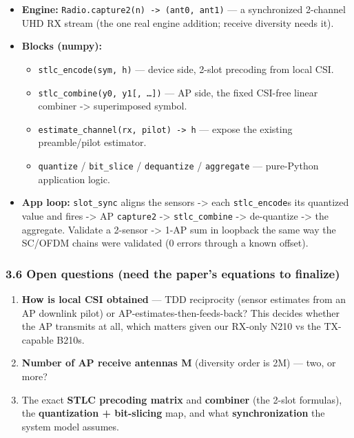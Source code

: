 \documentclass[
  10pt,
]{article}
\providecommand{\tightlist}{%
  \setlength{\itemsep}{0pt}\setlength{\parskip}{0pt}}
\begin{document}
\begin{itemize}
\tightlist
\item
  \textbf{Engine:}
  \texttt{Radio.capture2(n)\ -\textgreater{}\ (ant0,\ ant1)} --- a
  synchronized 2-channel UHD RX stream (the one real engine addition;
  receive diversity needs it).
\item
  \textbf{Blocks (numpy):}

  \begin{itemize}
  \tightlist
  \item
    \texttt{stlc\_encode(sym,\ h)} --- device side, 2-slot precoding
    from local CSI.
  \item
    \texttt{stlc\_combine(y0,\ y1{[},\ \ldots{}{]})} --- AP side, the
    fixed CSI-free linear combiner -\textgreater{} superimposed symbol.
  \item
    \texttt{estimate\_channel(rx,\ pilot)\ -\textgreater{}\ h} ---
    expose the existing preamble/pilot estimator.
  \item
    \texttt{quantize} / \texttt{bit\_slice} / \texttt{dequantize} /
    \texttt{aggregate} --- pure-Python application logic.
  \end{itemize}
\item
  \textbf{App loop:} \texttt{slot\_sync} aligns the sensors
  -\textgreater{} each \texttt{stlc\_encode}s its quantized value and
  fires -\textgreater{} AP \texttt{capture2} -\textgreater{}
  \texttt{stlc\_combine} -\textgreater{} de-quantize -\textgreater{} the
  aggregate. Validate a 2-sensor -\textgreater{} 1-AP sum in loopback
  the same way the SC/OFDM chains were validated (0 errors through a
  known offset).
\end{itemize}

\hypertarget{36-open-questions-need-the-papers-equations-to-finalize}{%
\subsubsection{3.6 Open questions (need the paper's equations to
finalize)}\label{36-open-questions-need-the-papers-equations-to-finalize}}

\begin{enumerate}
\def\labelenumi{\arabic{enumi}.}
\tightlist
\item
  \textbf{How is local CSI obtained} --- TDD reciprocity (sensor
  estimates from an AP downlink pilot) or AP-estimates-then-feeds-back?
  This decides whether the AP transmits at all, which matters given our
  RX-only N210 vs the TX-capable B210s.
\item
  \textbf{Number of AP receive antennas M} (diversity order is 2M) ---
  two, or more?
\item
  The exact \textbf{STLC precoding matrix} and \textbf{combiner} (the
  2-slot formulas), the \textbf{quantization + bit-slicing} map, and
  what \textbf{synchronization} the system model assumes.
\end{enumerate}
\end{document}
